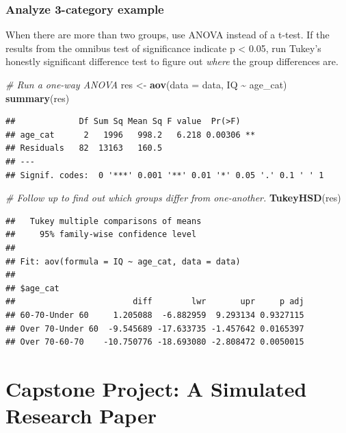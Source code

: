 \documentclass[
]{book}
\newenvironment{Shaded}{\begin{snugshade}}{\end{snugshade}}
\newcommand{\AttributeTok}[1]{\textcolor[rgb]{0.13,0.29,0.53}{#1}}
\newcommand{\CommentTok}[1]{\textcolor[rgb]{0.56,0.35,0.01}{\textit{#1}}}
\newcommand{\FunctionTok}[1]{\textcolor[rgb]{0.13,0.29,0.53}{\textbf{#1}}}
\newcommand{\NormalTok}[1]{#1}
\newcommand{\OtherTok}[1]{\textcolor[rgb]{0.56,0.35,0.01}{#1}}
\newcommand{\SpecialCharTok}[1]{\textcolor[rgb]{0.81,0.36,0.00}{\textbf{#1}}}
\begin{document}
\subsection{Analyze 3-category example}\label{analyze-3-category-example}

When there are more than two groups, use ANOVA instead of a t-test. If the results from the omnibus test of significance indicate p \textless{} 0.05, run Tukey's honestly significant difference test to figure out \emph{where} the group differences are.

\begin{Shaded}
\begin{Highlighting}[]
\CommentTok{\# Run a one{-}way ANOVA}
\NormalTok{res }\OtherTok{\textless{}{-}} \FunctionTok{aov}\NormalTok{(}\AttributeTok{data =}\NormalTok{ data, IQ }\SpecialCharTok{\textasciitilde{}}\NormalTok{ age\_cat)}
\FunctionTok{summary}\NormalTok{(res)}
\end{Highlighting}
\end{Shaded}

\begin{verbatim}
##             Df Sum Sq Mean Sq F value  Pr(>F)   
## age_cat      2   1996   998.2   6.218 0.00306 **
## Residuals   82  13163   160.5                   
## ---
## Signif. codes:  0 '***' 0.001 '**' 0.01 '*' 0.05 '.' 0.1 ' ' 1
\end{verbatim}

\begin{Shaded}
\begin{Highlighting}[]
\CommentTok{\# Follow up to find out which groups differ from one{-}another. }
\FunctionTok{TukeyHSD}\NormalTok{(res)}
\end{Highlighting}
\end{Shaded}

\begin{verbatim}
##   Tukey multiple comparisons of means
##     95% family-wise confidence level
## 
## Fit: aov(formula = IQ ~ age_cat, data = data)
## 
## $age_cat
##                        diff        lwr       upr     p adj
## 60-70-Under 60     1.205088  -6.882959  9.293134 0.9327115
## Over 70-Under 60  -9.545689 -17.633735 -1.457642 0.0165397
## Over 70-60-70    -10.750776 -18.693080 -2.808472 0.0050015
\end{verbatim}

\chapter*{Capstone Project: A Simulated Research Paper}\label{capstone-project-a-simulated-research-paper}
\end{document}
